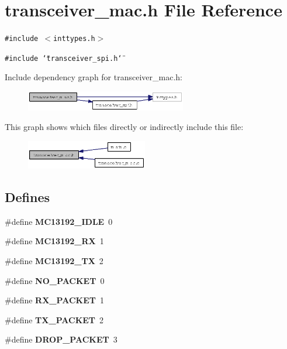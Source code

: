 \section{transceiver\_\-mac.h File Reference}
\label{transceiver__mac_8h}
{\tt \#include $<$inttypes.h$>$}\par
{\tt \#include \char`\"{}transceiver\_\-spi.h\char`\"{}}\par


Include dependency graph for transceiver\_\-mac.h:\begin{figure}[H]
\begin{center}
\leavevmode
\includegraphics[width=199pt]{transceiver__mac_8h__incl}
\end{center}
\end{figure}


This graph shows which files directly or indirectly include this file:\begin{figure}[H]
\begin{center}
\leavevmode
\includegraphics[width=150pt]{transceiver__mac_8h__dep__incl}
\end{center}
\end{figure}
\subsection*{Defines}
\begin{CompactItemize}
\item 
\#define {\bf MC13192\_\-IDLE}~0
\item 
\#define {\bf MC13192\_\-RX}~1
\item 
\#define {\bf MC13192\_\-TX}~2
\item 
\#define {\bf NO\_\-PACKET}~0
\item 
\#define {\bf RX\_\-PACKET}~1
\item 
\#define {\bf TX\_\-PACKET}~2
\item 
\#define {\bf DROP\_\-PACKET}~3
\end{CompactItemize}
